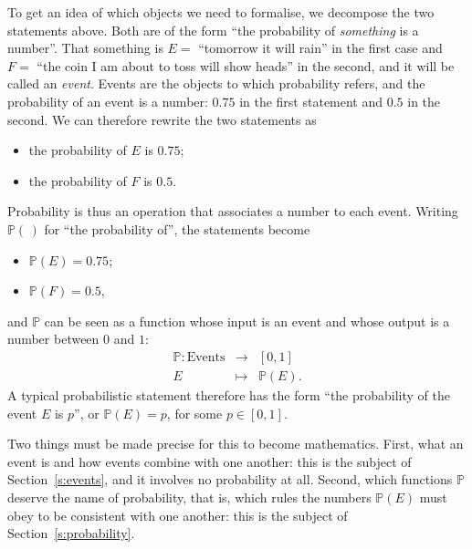 To get an idea of which objects we need to formalise, we decompose the two statements above. Both are of the form ``the probability of \emph{something} is a number''. That something is $E = $ ``tomorrow it will rain'' in the first case and $F = $ ``the coin I am about to toss will show heads'' in the second, and it will be called an \emph{event}. Events are the objects to which probability refers, and the probability of an event is a number: $0.75$ in the first statement and $0.5$ in the second. We can therefore rewrite the two statements as
\begin{itemize}
	\item the probability of $E$ is $0.75$;
	\item the probability of $F$ is $0.5$.
\end{itemize}
Probability is thus an operation that associates a number to each event. Writing $\mathbb P(\,)$ for ``the probability of'', the statements become
\begin{itemize}
	\item $\mathbb P(E) = 0.75$;
	\item $\mathbb P(F) = 0.5$,
\end{itemize}
and $\mathbb P$ can be seen as a function whose input is an event and whose output is a number between $0$ and $1$:
\begin{equation}
	\begin{array}{ccc}
		\mathbb P: \text{Events} & \to & [0,1]\\
		E & \mapsto & \mathbb P(E).
	\end{array}
\end{equation}
A typical probabilistic statement therefore has the form ``the probability of the event $E$ is $p$'', or $\mathbb P(E) = p$, for some $p \in [0,1]$.

Two things must be made precise for this to become mathematics. First, what an event is and how events combine with one another: this is the subject of Section~\ref{s:events}, and it involves no probability at all. Second, which functions $\mathbb P$ deserve the name of probability, that is, which rules the numbers $\mathbb P(E)$ must obey to be consistent with one another: this is the subject of Section~\ref{s:probability}.
	

